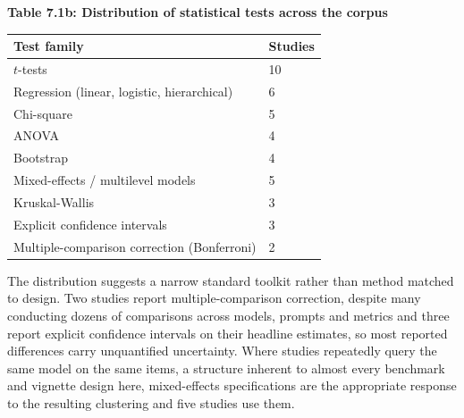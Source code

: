 \documentclass[11pt]{article}
\begin{document}
	\begin{center}
		\textbf{Table 7.1b: Distribution of statistical tests across the corpus}
		\vspace{2pt}
		
		\footnotesize
		\setlength{\tabcolsep}{3pt}\renewcommand{\arraystretch}{1.1}
		\begin{tabularx}{\textwidth}{|X|X|}
			\hline
			\textbf{Test family} & \textbf{Studies} \\
			\hline
			$t$-tests & 10 \\
			\hline
			Regression (linear, logistic, hierarchical) & 6 \\
			\hline
			Chi-square & 5 \\
			\hline
			ANOVA & 4 \\
			\hline
			Bootstrap & 4 \\
			\hline
			Mixed-effects / multilevel models & 5 \\
			\hline
			Kruskal-Wallis & 3 \\
			\hline
			Explicit confidence intervals & 3 \\
			\hline
			Multiple-comparison correction (Bonferroni) & 2 \\
			\hline
		\end{tabularx}
	\end{center}
	
	The distribution suggests a narrow standard toolkit rather than method matched to design. Two studies report multiple-comparison correction, despite many conducting dozens of comparisons across models, prompts and metrics and three report explicit confidence intervals on their headline estimates, so most reported differences carry unquantified uncertainty. Where studies repeatedly query the same model on the same items, a structure inherent to almost every benchmark and vignette design here, mixed-effects specifications are the appropriate response to the resulting clustering and five studies use them.
	
\end{document}
